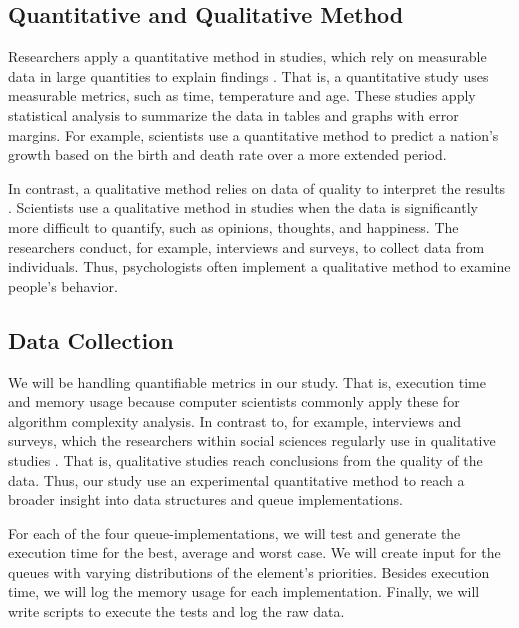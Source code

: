 \documentclass[a4paper,11pt]{kth-mag}
\newcommand*{\skippara}{\par\vspace{\baselineskip} \noindent}
\begin{document}
\subsection{Quantitative and Qualitative Method}
Researchers apply a quantitative method in studies, which rely on measurable data in large quantities to explain findings \cite{haakansson2013portal}.
That is, a quantitative study uses measurable metrics, such as time, temperature and age.
These studies apply statistical analysis to summarize the data in tables and graphs with error margins.
For example, scientists use a quantitative method to predict a nation's growth based on the birth and death rate over a more extended period.

\skippara In contrast, a qualitative method relies on data of quality to interpret the results \cite{merriam2009qualitative}.
Scientists use a qualitative method in studies when the data is significantly more difficult to quantify, such as opinions, thoughts, and happiness.
The researchers conduct, for example, interviews and surveys, to collect data from individuals.
Thus, psychologists often implement a qualitative method to examine people's behavior.

\subsection{Data Collection}
We will be handling quantifiable metrics in our study.
That is, execution time and memory usage because computer scientists commonly apply these for algorithm complexity analysis.
In contrast to, for example, interviews and surveys, which the researchers within social sciences regularly use in qualitative studies \cite{Omexperi69:online, haakansson2013portal}.
That is, qualitative studies reach conclusions from the quality of the data.
Thus, our study use an experimental quantitative method to reach a broader insight into data structures and queue implementations.

\skippara For each of the four queue-implementations, we will test and generate the execution time for the best, average and worst case.
We will create input for the queues with varying distributions of the element's priorities.
Besides execution time, we will log the memory usage for each implementation.
Finally, we will write scripts to execute the tests and log the raw data.
\end{document}

